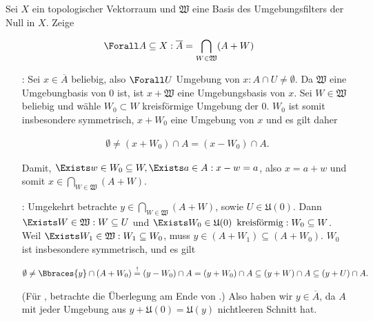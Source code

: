 \begin{exercise}

Sei $X$ ein topologischer Vektorraum und $\mathfrak{W}$ eine Basis des Umgebungsfilters der Null in $X$.
Zeige

\begin{align*}
  \Forall A \subseteq X:
  \overline{A}
  =
  \bigcap_{W \in \mathfrak{W}} (A + W)
\end{align*}

\end{exercise}

\begin{solution}

\phantom{}

\begin{itemize}

  \item[\Quote{$\subseteq$}:]
  Sei $x \in \overline{A}$ beliebig, also $\Forall U$ Umgebung von $x: A \cap U \neq \emptyset$.
  Da $\mathfrak{W}$ eine Umgebungbasis von $0$ ist, ist $x + \mathfrak{W}$ eine Umgebungsbasis von $x$.
  Sei $W \in \mathfrak{W}$ beliebig und wähle $W_0 \subset W$ kreisförmige Umgebung der $0$.
  $W_0$ ist somit insbesondere symmetrisch, $x + W_0$ eine Umgebung von $x$ und es gilt daher

  \begin{align*}
    \emptyset
    \neq
    (x + W_0) \cap A
    =
    (x - W_0) \cap A.
  \end{align*}

  Damit, $\Exists w \in W_0 \subseteq W, \Exists a \in A: x - w = a$, also $x = a + w$ und somit $x \in \bigcap_{W \in \mathfrak{W}}(A + W)$.

  \item[\Quote{$\supseteq$}:]
  Umgekehrt betrachte $y \in \bigcap_{W \in \mathfrak{W}}(A + W)$, sowie $ U \in \mathfrak{U}(0)$.
  Dann $\Exists W \in \mathfrak{W}: W \subseteq U$ und $\Exists W_0 \in \mathfrak{U}(0) \enspace \text{kreisförmig}: W_0 \subseteq W$.
  Weil $\Exists W_1 \in \mathfrak{W}: W_1 \subseteq W_0$, muss $y \in (A + W_1) \subseteq (A + W_0)$.
  $W_0$ ist insbesondere symmetrisch, und es gilt

  \begin{align*}
    \emptyset
    \neq
    \Bbraces{y} \cap (A + W_0)
    \stackrel{!}{=}
    (y - W_0) \cap A = (y + W_0) \cap A
    \subseteq
    (y + W) \cap A
    \subseteq
    (y + U) \cap A.
  \end{align*}

  (Für \Quote{!}, betrachte die Überlegung am Ende von \Quote{$\subseteq$}.)
  Also haben wir $y \in \overline{A}$, da $A$ mit jeder Umgebung aus $y + \mathfrak{U}(0) = \mathfrak{U}(y)$ nichtleeren Schnitt hat.

\end{itemize}

\end{solution}
